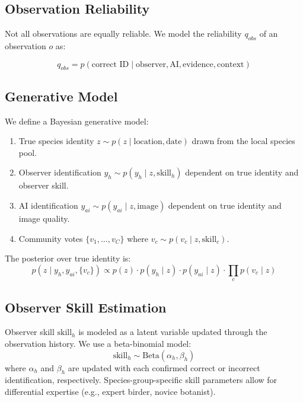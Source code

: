 \documentclass[11pt,a4paper]{article}
\begin{document}
\subsection{Observation Reliability}

Not all observations are equally reliable. We model the reliability
$q_{obs}$ of an observation $o$ as:

\begin{equation}
  q_{obs} = p(\text{correct ID} \mid \text{observer}, \text{AI},
  \text{evidence}, \text{context})
\end{equation}

\subsection{Generative Model}

We define a Bayesian generative model:

\begin{enumerate}
  \item True species identity $z \sim p(z \mid \text{location}, \text{date})$
    drawn from the local species pool.
  \item Observer identification $y_h \sim p(y_h \mid z, \text{skill}_h)$
    dependent on true identity and observer skill.
  \item AI identification $y_{ai} \sim p(y_{ai} \mid z, \text{image})$
    dependent on true identity and image quality.
  \item Community votes $\{v_1, \ldots, v_C\}$ where
    $v_c \sim p(v_c \mid z, \text{skill}_c)$.
\end{enumerate}

The posterior over true identity is:
\begin{equation}
  p(z \mid y_h, y_{ai}, \{v_c\}) \propto
  p(z) \cdot p(y_h \mid z) \cdot p(y_{ai} \mid z) \cdot
  \prod_c p(v_c \mid z)
\end{equation}

\subsection{Observer Skill Estimation}

Observer skill $\text{skill}_h$ is modeled as a latent variable updated
through the observation history. We use a beta-binomial model:
\begin{equation}
  \text{skill}_h \sim \text{Beta}(\alpha_h, \beta_h)
\end{equation}
where $\alpha_h$ and $\beta_h$ are updated with each confirmed
correct or incorrect identification, respectively. Species-group-specific
skill parameters allow for differential expertise (e.g., expert birder,
novice botanist).
\end{document}

